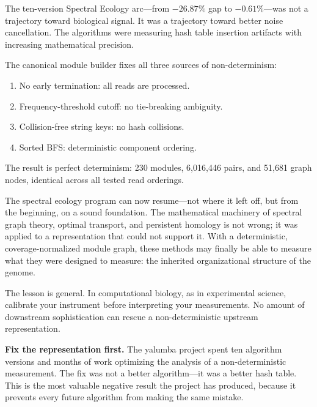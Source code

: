 \documentclass{../yalumba}
\begin{document}
The ten-version Spectral Ecology arc---from $-26.87\%$ gap to $-0.61\%$---was
not a trajectory toward biological signal. It was a trajectory toward better
noise cancellation. The algorithms were measuring hash table insertion artifacts
with increasing mathematical precision.

The canonical module builder fixes all three sources of non-determinism:
\begin{enumerate}[leftmargin=2em]
  \item No early termination: all reads are processed.
  \item Frequency-threshold cutoff: no tie-breaking ambiguity.
  \item Collision-free string keys: no hash collisions.
  \item Sorted BFS: deterministic component ordering.
\end{enumerate}

The result is perfect determinism: 230 modules, 6,016,446 pairs, and 51,681
graph nodes, identical across all tested read orderings.

The spectral ecology program can now resume---not where it left off, but from
the beginning, on a sound foundation. The mathematical machinery of spectral
graph theory, optimal transport, and persistent homology is not wrong; it was
applied to a representation that could not support it. With a deterministic,
coverage-normalized module graph, these methods may finally be able to measure
what they were designed to measure: the inherited organizational structure of
the genome.

The lesson is general. In computational biology, as in experimental science,
calibrate your instrument before interpreting your measurements. No amount
of downstream sophistication can rescue a non-deterministic upstream
representation.

\begin{keyfinding}
\textbf{Fix the representation first.} The yalumba project spent ten algorithm
versions and months of work optimizing the analysis of a non-deterministic
measurement. The fix was not a better algorithm---it was a better hash table.
This is the most valuable negative result the project has produced, because
it prevents every future algorithm from making the same mistake.
\end{keyfinding}




\end{document}
